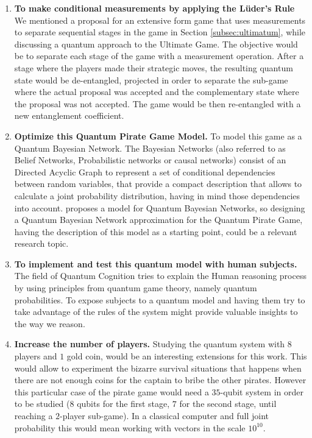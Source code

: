\begin{enumerate}

\item \textbf{To make conditional measurements by applying the L\"{u}der's Rule} We mentioned a proposal for an extensive form game that uses measurements to separate sequential stages in the game in Section \ref{subsec:ultimatum}, while discussing a quantum approach to the Ultimate Game. The objective would be to separate each stage of the game with a measurement operation. After a stage where the players made their strategic moves, the resulting quantum state would be de-entangled, projected in order to separate  the sub-game where the actual proposal was accepted and the complementary state where the proposal was not accepted. The game would be then re-entangled with a new entanglement coefficient. 

\item \textbf{Optimize this Quantum Pirate Game Model.} To model this game as a Quantum Bayesian Network. The Bayesian Networks (also referred to as Belief Networks, Probabilistic networks or causal networks) consist of an Directed Acyclic Graph to represent a set of conditional dependencies between random variables, that provide a compact description that allows to calculate a joint probability distribution, having in mind those dependencies into account. \cite{Tucci2012} proposes a model for Quantum Bayesian Networks, so designing a Quantum Bayesian Network approximation for the Quantum Pirate Game, having the description of this model as a starting point, could be a relevant research topic.

\item \textbf{To implement and test this quantum model with human subjects.} The field of Quantum Cognition tries to explain the Human reasoning process by using principles from quantum game theory, namely quantum probabilities. To expose subjects to a quantum model and having them try to take advantage of the rules of the system might provide valuable insights to the way we reason. 

\item \textbf{Increase the number of players.} Studying the quantum system with $8$ players and $1$ gold coin, would be an interesting extensions for this work. This would allow to experiment the bizarre survival situations that happens when there are not enough coins for the captain to bribe the other pirates. However this particular case of the pirate game would need a $35$-qubit system in order to be studied ($8$ qubits for the first stage, $7$ for the second stage, until reaching a $2$-player sub-game). In a classical computer and full joint probability this would mean working with vectors in the scale $10^{10}$.


\end{enumerate}
